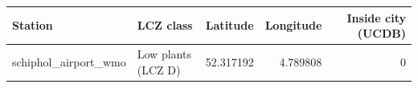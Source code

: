\begin{tabular}{llrrr}
\toprule
Station & LCZ class & Latitude & Longitude & Inside city (UCDB) \\
\midrule
schiphol_airport_wmo & Low plants (LCZ D) & 52.317192 & 4.789808 & 0 \\
\bottomrule
\end{tabular}
